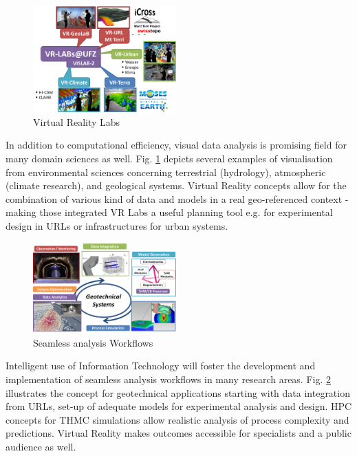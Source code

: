 \begin{figure}
\vspace{-0mm}
\centering
\includegraphics[width=0.49\textwidth]{figures/vr-labs}
\caption{Virtual Reality Labs}
\label{fig:syn-vis}
\end{figure}
In addition to computational efficiency, visual data analysis is promising field for many domain sciences as well. Fig. \ref{fig:syn-vis} depicts several examples of visualisation from environmental sciences concerning terrestrial (hydrology), atmospheric (climate research), and geological systems. Virtual Reality concepts allow for the combination of various kind of data and models in a real geo-referenced context - making those integrated VR Labs a useful planning tool e.g. for experimental design in URLs or infrastructures for urban systems.

\begin{figure}
\vspace{-3mm}
\centering
\includegraphics[width=0.49\textwidth]{figures/workflow-geotechnics}
\caption{Seamless analysis Workflows}
\label{fig:syn-workflows}
\end{figure}
Intelligent use of Information Technology will foster the development and implementation of seamless analysis workflows in many research areas. Fig. \ref{fig:syn-workflows} illustrates the concept for geotechnical applications starting with data integration from URLs, set-up of adequate models for experimental analysis and design. HPC concepts for THMC simulations allow realistic analysis of process complexity and predictions. Virtual Reality makes outcomes accessible for specialists and a public audience as well.

